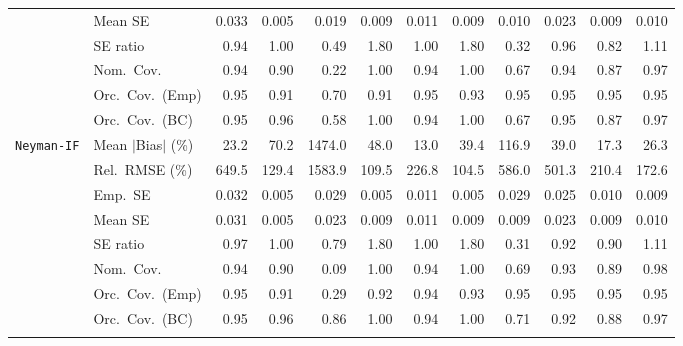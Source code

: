 \begin{landscape}
\begin{longtable}{llrrrrrrrrrr}
 & Mean SE & 0.033 & 0.005 & 0.019 & 0.009 & 0.011 & 0.009 & 0.010 & 0.023 & 0.009 & 0.010 \\
 & SE ratio & 0.94 & \cellcolor{rankone}1.00 & 0.49 & 1.80 & \cellcolor{ranktwo}1.00 & 1.80 & 0.32 & \cellcolor{rankthree}0.96 & 0.82 & 1.11 \\
 & Nom.\ Cov. & \cellcolor{rankone}0.94 & 0.90 & 0.22 & 1.00 & \cellcolor{ranktwo}0.94 & 1.00 & 0.67 & \cellcolor{rankthree}0.94 & 0.87 & 0.97 \\
 & Orc.\ Cov.\ (Emp) & \cellcolor{ranktwo}0.95 & 0.91 & 0.70 & 0.91 & 0.95 & 0.93 & 0.95 & \cellcolor{rankone}0.95 & 0.95 & \cellcolor{rankthree}0.95 \\
 & Orc.\ Cov.\ (BC) & \cellcolor{rankone}0.95 & \cellcolor{rankthree}0.96 & 0.58 & 1.00 & 0.94 & 1.00 & 0.67 & \cellcolor{ranktwo}0.95 & 0.87 & 0.97 \\
\addlinespace[2pt]
\quad \texttt{Neyman-IF} & Mean $|$Bias$|$ (\%) & \cellcolor{rankthree}23.2 & 70.2 & 1474.0 & 48.0 & \cellcolor{rankone}13.0 & 39.4 & 116.9 & 39.0 & \cellcolor{ranktwo}17.3 & 26.3 \\
 & Rel.\ RMSE (\%) & 649.5 & \cellcolor{rankthree}129.4 & 1583.9 & \cellcolor{ranktwo}109.5 & 226.8 & \cellcolor{rankone}104.5 & 586.0 & 501.3 & 210.4 & 172.6 \\
 & Emp.\ SE & 0.032 & 0.005 & 0.029 & 0.005 & 0.011 & 0.005 & 0.029 & 0.025 & 0.010 & 0.009 \\
 & Mean SE & 0.031 & 0.005 & 0.023 & 0.009 & 0.011 & 0.009 & 0.009 & 0.023 & 0.009 & 0.010 \\
 & SE ratio & \cellcolor{rankthree}0.97 & \cellcolor{rankone}1.00 & 0.79 & 1.80 & \cellcolor{ranktwo}1.00 & 1.80 & 0.31 & 0.92 & 0.90 & 1.11 \\
 & Nom.\ Cov. & \cellcolor{rankone}0.94 & 0.90 & 0.09 & 1.00 & \cellcolor{ranktwo}0.94 & 1.00 & 0.69 & \cellcolor{rankthree}0.93 & 0.89 & 0.98 \\
 & Orc.\ Cov.\ (Emp) & \cellcolor{rankone}0.95 & 0.91 & 0.29 & 0.92 & 0.94 & 0.93 & \cellcolor{rankthree}0.95 & 0.95 & \cellcolor{ranktwo}0.95 & 0.95 \\
 & Orc.\ Cov.\ (BC) & \cellcolor{rankone}0.95 & \cellcolor{ranktwo}0.96 & 0.86 & 1.00 & \cellcolor{rankthree}0.94 & 1.00 & 0.71 & 0.92 & 0.88 & 0.97 \\
\addlinespace[2pt]
\end{longtable}
\end{landscape}
